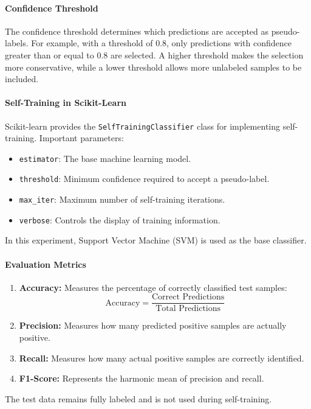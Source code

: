 \documentclass[a4paper,11pt]{article}
\begin{document}
\paragraph{Confidence Threshold}
The confidence threshold determines which predictions are accepted as pseudo-labels. For example, with a threshold of 0.8, only predictions with confidence greater than or equal to 0.8 are selected. A higher threshold makes the selection more conservative, while a lower threshold allows more unlabeled samples to be included.

\paragraph{Self-Training in Scikit-Learn}
Scikit-learn provides the \texttt{SelfTrainingClassifier} class for implementing self-training. Important parameters:
\begin{itemize}
    \item \texttt{estimator}: The base machine learning model.
    \item \texttt{threshold}: Minimum confidence required to accept a pseudo-label.
    \item \texttt{max\_iter}: Maximum number of self-training iterations.
    \item \texttt{verbose}: Controls the display of training information.
\end{itemize}
In this experiment, Support Vector Machine (SVM) is used as the base classifier.

\paragraph{Evaluation Metrics}
\begin{enumerate}
    \item \textbf{Accuracy:} Measures the percentage of correctly classified test samples:
    \[
    \text{Accuracy} = \frac{\text{Correct Predictions}}{\text{Total Predictions}}
    \]
    \item \textbf{Precision:} Measures how many predicted positive samples are actually positive.
    \item \textbf{Recall:} Measures how many actual positive samples are correctly identified.
    \item \textbf{F1-Score:} Represents the harmonic mean of precision and recall.
\end{enumerate}
The test data remains fully labeled and is not used during self-training.
\end{document}
